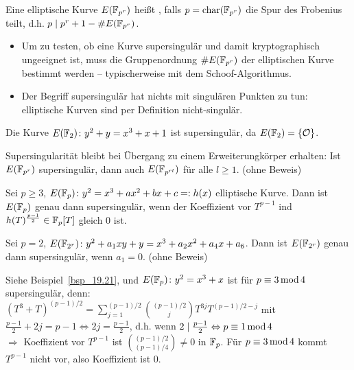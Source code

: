 \begin{defn}[supersingulär]
	Eine elliptische Kurve $E(\mathbb{F}_{p^r})$ heißt , falls $ p =\operatorname{char}(\mathbb{F}_{p^r})$ die Spur des Frobenius teilt, d.h. $p \mid p^r +1 - \#E(\mathbb{F}_{p^r})$.
\end{defn}

\begin{bem}
	\begin{itemize}
		\item Um zu testen, ob eine Kurve supersingulär und damit kryptographisch ungeeignet ist, muss die Gruppenordnung $\#E(\mathbb{F}_{p^r})$ der elliptischen Kurve bestimmt werden -- typischerweise mit dem Schoof-Algorithmus.
		\item Der Begriff supersingulär hat nichts mit singulären Punkten zu tun:
		elliptische Kurven sind per Definition nicht-singulär.
	\end{itemize}
\end{bem}

\begin{bsp}
\label{bsp_19.21}
	Die Kurve $E(\mathbb{F}_2)\colon y^2 + y = x^3 + x + 1$ ist supersingulär, da $E(\mathbb{F}_2) = \{ \mathcal{O} \}$.
\end{bsp}

\begin{bem}
	Supersingularität bleibt bei Übergang zu einem Erweiterungkörper erhalten:
	Ist $E(\mathbb{F}_{p^r})$ supersingulär, dann auch $E(\mathbb{F}_{p^{rl}})$ für alle $l \geq 1$. (ohne Beweis)
\end{bem}

\begin{satz}
	Sei $p \geq 3$, $E(\mathbb{F}_p) \colon y^2 = x^3 + ax^2 + bx + c =: h(x)$ elliptische Kurve.
	Dann ist $E(\mathbb{F}_{p})$ genau dann supersingulär, wenn der Koeffizient vor $T^{p-1}$ ind $h(T)^{\frac{p-1}{2}} \in \mathbb{F}_p[T]$ gleich $0$ ist.
\end{satz}

\begin{satz}
	Sei $p = 2$, $E(\mathbb{F}_{2^r}) \colon y^2 + a_1 xy + y = x^3 + a_2 x^2 + a_4 x + a_6$.
	Dann ist $E(\mathbb{F}_{2^r})$ genau dann supersingulär, wenn $a_1 = 0$. (ohne Beweis)
\end{satz}

\begin{bsp}
	Siehe Beispiel~\ref{bsp_19.21}, und $E(\mathbb{F}_p) \colon y^2 = x^3 + x$ ist für $p \equiv 3 \operatorname{mod} 4$ supersingulär, denn: \\
	$(T^3 + T)^{(p-1)/2} = \sum_{j=1}^{(p-1)/2} \binom{(p-1)/2}{j} T^{3j} T^{(p-1)/2-j}$ mit $\frac{p-1}{2} + 2j = p-1 \Leftrightarrow 2j = \frac{p-1}{2}$, d.h. wenn $2 \mid \frac{p-1}{2} \Leftrightarrow p \equiv 1 \operatorname{mod} 4$ \\
	$\Rightarrow$ Koeffizient vor $T^{p-1}$ ist $\binom{(p-1)/2}{(p-1)/4} \neq 0$ in $\mathbb{F}_p$. Für $p \equiv 3 \operatorname{mod} 4$ kommt $T^{p-1}$ nicht vor, also Koeffizient ist $0$.
\end{bsp}

